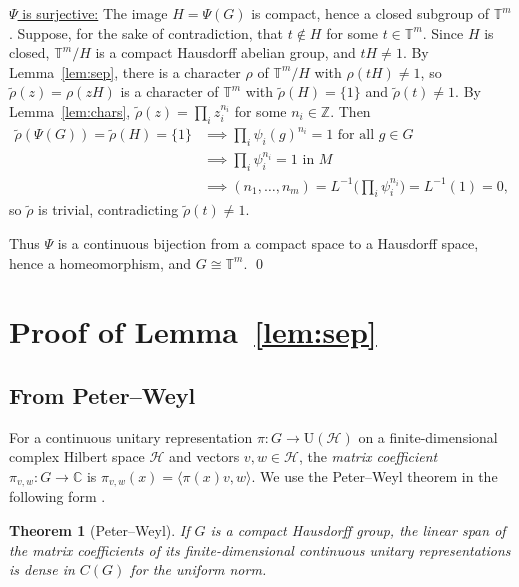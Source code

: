 \documentclass[11pt]{article}
\newtheorem{theorem}{Theorem}
\newcommand{\T}{\mathbb{T}}
\newcommand{\Z}{\mathbb{Z}}
\newcommand{\C}{\mathbb{C}}
\begin{document}
\uline{$\Psi$ is surjective:} The image $H = \Psi(G)$ is compact, hence a closed subgroup of $\T^m$. Suppose, for the sake of contradiction, that $t \notin H$ for some $t \in \T^m$. Since $H$ is closed, $\T^m/H$ is a compact Hausdorff abelian group, and $tH \neq 1$. By Lemma~\ref{lem:sep}, there is a character $\rho$ of $\T^m/H$ with $\rho(tH) \neq 1$, so $\tilde\rho(z) = \rho(zH)$ is a character of $\T^m$ with $\tilde\rho(H) = \{1\}$ and $\tilde\rho(t) \neq 1$. By Lemma~\ref{lem:chars}, $\tilde\rho(z) = \prod_i z_i^{n_i}$ for some $n_i \in \Z$. Then
\begin{align*}
  \tilde\rho(\Psi(G)) = \tilde\rho(H) = \{1\}
  &\implies \textstyle\prod_i \psi_i(g)^{n_i} = 1 \text{ for all } g \in G \\
  &\implies \textstyle\prod_i \psi_i^{n_i} = 1 \text{ in } M \\
  &\implies (n_1, \dots, n_m) = L^{-1}\bigl(\textstyle\prod_i \psi_i^{n_i}\bigr) = L^{-1}(1) = 0,
\end{align*}
so $\tilde\rho$ is trivial, contradicting $\tilde\rho(t) \neq 1$.

Thus $\Psi$ is a continuous bijection from a compact space to a Hausdorff space, hence a homeomorphism, and $G \cong \T^m$. \qed

\section{Proof of Lemma~\ref{lem:sep}}\label{sec:sep}

\subsection{From Peter--Weyl}

For a continuous unitary representation $\pi\colon G \to \mathrm{U}(\mathcal{H})$ on a finite-dimensional complex Hilbert space $\mathcal{H}$ and vectors $v, w \in \mathcal{H}$, the \emph{matrix coefficient} $\pi_{v,w}\colon G \to \C$ is $\pi_{v,w}(x) = \langle \pi(x)v, w\rangle$. We use the Peter--Weyl theorem in the following form \cite[Theorem~5.12]{Folland}.

\begin{theorem}[Peter--Weyl]\label{thm:pw}
If $G$ is a compact Hausdorff group, the linear span of the matrix coefficients of its finite-dimensional continuous unitary representations is dense in $C(G)$ for the uniform norm.
\end{theorem}
\end{document}
